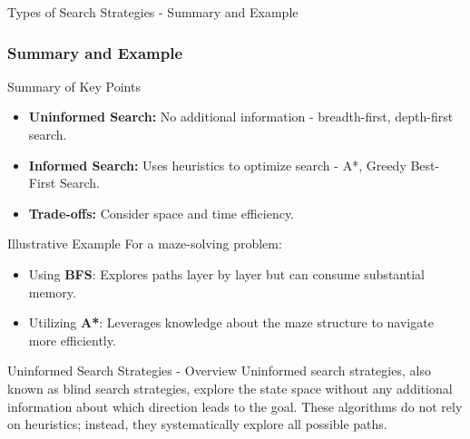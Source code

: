 \documentclass[aspectratio=169]{beamer}
\begin{document}
\begin{frame}[fragile]{Types of Search Strategies - Summary and Example}
    \frametitle{Summary and Example}
    \begin{block}{Summary of Key Points}
        \begin{itemize}
            \item \textbf{Uninformed Search:} No additional information - breadth-first, depth-first search.
            \item \textbf{Informed Search:} Uses heuristics to optimize search - A*, Greedy Best-First Search.
            \item \textbf{Trade-offs:} Consider space and time efficiency.
        \end{itemize}
    \end{block}
    
    \begin{block}{Illustrative Example}
        For a maze-solving problem:
        \begin{itemize}
            \item Using \textbf{BFS}: Explores paths layer by layer but can consume substantial memory.
            \item Utilizing \textbf{A*}: Leverages knowledge about the maze structure to navigate more efficiently.
        \end{itemize}
    \end{block}
\end{frame}

\begin{frame}[fragile]{Uninformed Search Strategies - Overview}
    Uninformed search strategies, also known as blind search strategies, explore the state space without any additional information about which direction leads to the goal. These algorithms do not rely on heuristics; instead, they systematically explore all possible paths.
\end{frame}
\end{document}
